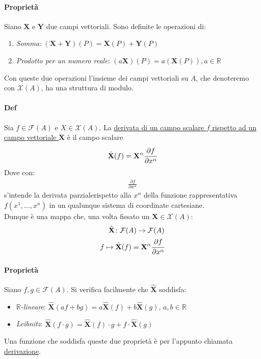 \documentclass[10pt,a4paper]{book}
\begin{document}
    \paragraph*{Proprietà} Siano $\mathbf{X}$ e $\mathbf{Y}$ due campi vettoriali. Sono definite le operazioni di:
    \begin{enumerate}
        \item \textit{Somma}: $(\mathbf{X}+\mathbf{Y})(P)=\mathbf{X}(P)+\mathbf{Y}(P)$
        \item \textit{Prodotto per un numero reale}: $(a\mathbf{X})(P)=a(\mathbf{X}(P)), a \in \mathbb{R}$
    \end{enumerate}
    Con queste due operazioni l'insieme dei campi vettoriali su $A$, che denoteremo con $\mathcal{X}(A)$, ha una struttura di modulo.
    \paragraph{Def} Sia $f\in \mathcal{F}(A)$ e $X\in \mathcal{X}(A)$. La \underline{derivata di un campo scalare $f$ rispetto ad un campo vettoriale $\textbf{X}$} è il campo scalare 
    \begin{align*}
        \hat{\textbf{X}} (f)=\textbf{X}^\alpha\cfrac{\partial f}{\partial x^\alpha}
    \end{align*}
    Dove con: 
    \begin{align*}
            \frac{\partial f}{\partial x^\alpha}
    \end{align*}
    s'intende la derivata parzialerispetto alla $x^\alpha$ della funzione rappresentativa $f(x^1,\dots,x^n)$ in un qualunque sistema di coordinate cartesiane.\\
    Dunque è una mappa che, una volta fissato un $\mathbf{X}\in \mathcal{X}(A)$:
    \begin{align*}
        \hat{\textbf{X}} \colon \mathcal{F}(A)\to \mathcal{F}(A)\\
        f\mapsto \hat{\textbf{X}} (f)=\textbf{X}^\alpha\cfrac{\partial f}{\partial x^\alpha}
    \end{align*}
    \paragraph{Proprietà} Siano $f,g\in \mathcal{F}(A)$. Si verifica facilmente che $\hat{\textbf{X}}$ soddisfa:
    \begin{itemize}
        \item \textit{$\mathbb{R}$-lineare}: $\hat{\textbf{X}}(af+bg)=a\hat{\textbf{X}}(f)+b\hat{\textbf{X}}(g)$, $a,b\in \mathbb{R}$
        \item \textit{Leibnitz}: $\hat{\textbf{X}}(f\cdot g)=\hat{\textbf{X}}(f)\cdot g+f\cdot \hat{\textbf{X}}(g)$
    \end{itemize} Una funzione che soddisfa queste due proprietà è per l'appunto chiamata \underline{derivazione}.
\end{document}
